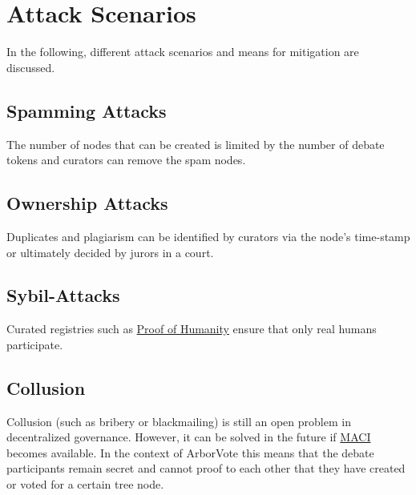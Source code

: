 \documentclass[%
aip,
amsmath,amssymb,
reprint,%
unsortedaddress,
nofootinbib
]{revtex4-2}
\begin{document}
\section{Attack Scenarios}
In the following, different attack scenarios and means for mitigation are discussed.

\subsection{Spamming Attacks}
The number of nodes that can be created is limited by the number of debate tokens and
curators can remove the spam nodes.

\subsection{Ownership Attacks}
Duplicates and plagiarism can be identified by  curators via the node's time-stamp
or ultimately decided by jurors in a court.

\subsection{Sybil-Attacks}
Curated registries such as \href{https://proofofhumanity.id/}{Proof of Humanity}
ensure that only real humans participate.


\subsection{Collusion}
Collusion (such as bribery or blackmailing) is still an open problem in decentralized governance.
However, it can be solved in the future if \href{https://ethresear.ch/t/minimal-anti-collusion-infrastructure/5413}{\ac{MACI}}\cite{Buterin2021} becomes available.
In the context of ArborVote this means that the debate participants remain secret and cannot proof to each other that they have created or voted for a certain tree node.
\end{document}
